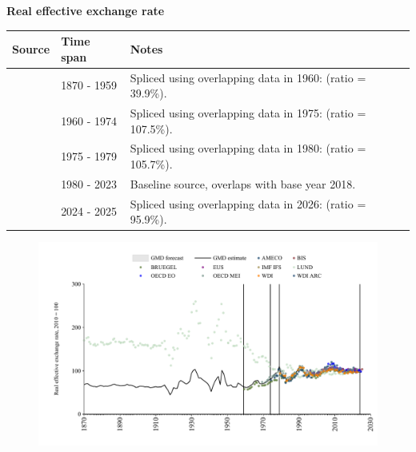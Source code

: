 \documentclass[12pt,a4paper,landscape]{article}
\begin{document}
\begin{adjustbox}{max totalsize={\paperwidth}{\paperheight},center}
\begin{minipage}[t][\textheight][t]{\textwidth}
\vspace*{0.5cm}
{}
\begin{center}
{\Large\bfseries Real effective exchange rate}
\end{center}
\vspace{0.5cm}
\begin{table}[H]
\centering
\small
\begin{tabular}{|l|l|l|}
\hline
\textbf{Source} & \textbf{Time span} & \textbf{Notes} \\
\hline
\rowcolor{white}\cite{LUND}& 1870 - 1959 &Spliced using overlapping data in 1960: (ratio = 39.9\%). \\
\rowcolor{lightgray}\cite{BRUEGEL}& 1960 - 1974 &Spliced using overlapping data in 1975: (ratio = 107.5\%). \\
\rowcolor{white}\cite{WDI_ARC}& 1975 - 1979 &Spliced using overlapping data in 1980: (ratio = 105.7\%). \\
\rowcolor{lightgray}\cite{WDI}& 1980 - 2023 &Baseline source, overlaps with base year 2018. \\
\rowcolor{white}\cite{BIS}& 2024 - 2025 &Spliced using overlapping data in 2026: (ratio = 95.9\%). \\
\hline
\end{tabular}
\end{table}
\begin{figure}[H]
\centering
\includegraphics[width=\textwidth,height=0.6\textheight,keepaspectratio]{graphs/ESP_REER.pdf}
\end{figure}
\end{minipage}
\end{adjustbox}
\end{document}
